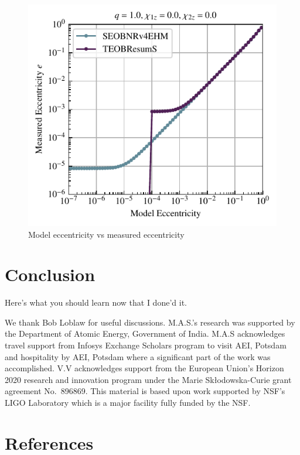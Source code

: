 \documentclass[aps,prd,amsmath,floats,floatfix, twocolumn,
superscriptaddress,nofootinbib,showpacs]{revtex4-1}
\begin{document}
\begin{figure}[htb]
  \centering
  \includegraphics[width=\columnwidth]{model_ecc_vs_measured_ecc_set1}
  \caption{Model eccentricity vs measured eccentricity}
\end{figure}

\section{Conclusion}
\label{sec:conclusion}
Here's what you should learn now that I done'd it.


\begin{acknowledgments}
We thank Bob Loblaw for useful discussions.
M.A.S.’s research was supported by the Department of Atomic Energy,
Government of India. M.A.S acknowledges travel support from Infosys
Exchange Scholars program to visit AEI, Potsdam and hospitality by
AEI, Potsdam where a significant part of the work was accomplished.
V.V acknowledges support from the European Union’s Horizon 2020
research and innovation program under the Marie Skłodowska-Curie grant
agreement No.~896869.
This material is based upon work supported by NSF's LIGO Laboratory
which is a major facility fully funded by the NSF.
\end{acknowledgments}

\section*{References}

\end{document}
